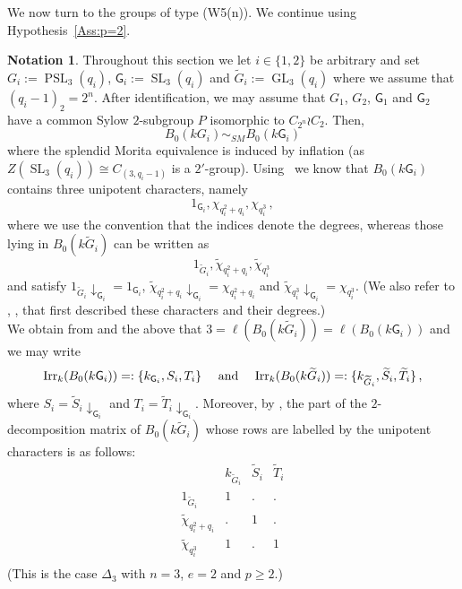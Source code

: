 \documentclass[12pt,a4paper]{amsart}
\theoremstyle{plain}\newtheorem{Theorem}{Theorem}[section]
\theoremstyle{plain}\newtheorem{Conjecture}[Theorem]{Conjecture}
\theoremstyle{plain}\newtheorem{Corollary}[Theorem]{Corollary}
\theoremstyle{plain}\newtheorem{Lemma}[Theorem]{Lemma}
\theoremstyle{plain}\newtheorem{Proposition}[Theorem]{Proposition}
\theoremstyle{definition}\newtheorem{Definition}[Theorem]{Definition}
\theoremstyle{definition}\newtheorem{Example}[Theorem]{Example}
\theoremstyle{definition}\newtheorem{Examples}[Theorem]{Examples}
\theoremstyle{definition}\newtheorem{Remark}[Theorem]{Remark}
\theoremstyle{definition}\newtheorem{Question}[Theorem]{Question}
\theoremstyle{definition}\newtheorem{Notation}[Theorem]{Notation}
\theoremstyle{definition}\newtheorem{Hypothesis}[Theorem]{Hypothesis}
\theoremstyle{definition}\newtheorem{Assumption}[Theorem]{Assumption}
\theoremstyle{definition}\newtheorem{Strategy}[Theorem]{Strategy}
\theoremstyle{definition}\newtheorem{Contents}[Theorem]{Contents}
\theoremstyle{definition}\newtheorem{Computations}[Theorem]{Computations}
\theoremstyle{definition}\newtheorem{Equivalences}[Theorem]{Equivalences}
\theoremstyle{definition}\newtheorem{Notation/Definition}[Theorem]{Notation/Definition}
\theoremstyle{definition}\newtheorem{noth}[Theorem]{}
\theoremstyle{plain}\newtheorem{Step}[Theorem]{Step}
\def\Res{\mathrm{Res}}
\DeclareMathOperator{\Inf}{Inf}
\newcommand{\PSL}{\operatorname{PSL}}
\newcommand{\SL}{\operatorname{SL}}
\newcommand{\GL}{\operatorname{GL}}
\begin{document}
We now turn to the groups of type {\sf (W5(n))}.  
We continue using Hypothesis~\ref{Ass:p=2}. 


\begin{Notation}\label{nota:PSL_{3}}%
Throughout this section we let  $i\in\{1,2\}$ be arbitrary and set  $G_{i}:=\PSL_{3}(q_{i})$, $\mathsf G_{i}:=\SL_{3}(q_{i})$ and $\widetilde{G}_{i}:=\GL_{3}(q_{i})$ where we assume that $(q_{i}-1)_{2}=2^{n}$. After identification, we may assume that  $G_{1}$, $G_{2}$, $\mathsf G_{1}$ and $\mathsf G_{2}$ have a common Sylow $2$-subgroup $P$ isomorphic to $C_{2^n}\wr C_2$. 
Then,
\begin{equation}\label{sm:PSLSLGL}
B_{0}(kG_{i})   \sim_{SM}   B_{0}(k\mathsf{G}_{i}) 
\end{equation}
where the splendid Morita equivalence is induced by inflation (as $Z(\SL_{3}(q_{i}))\cong C_{(3,q_{i}-1)}$ is a $2'$-group).
Using~\cite[Proposition~4.3.1 and Remark~4.2.1]{GM20} we know that $B_{0}(k\mathsf{G}_{i})$ contains three unipotent characters, namely
$$1_{\mathsf{G}_{i}}, \chi^{}_{q_{i}^2+q_{i}}, \chi^{}_{q_{i}^3}\,,$$ 
where we use the convention that the indices denote the degrees, whereas those lying in $B_{0}(k\widetilde{G}_{i})$ can be written as 
$$1_{\widetilde{G}_{i}}, \widetilde \chi^{}_{q_{i}^2+q_{i}}, \widetilde \chi^{}_{q_{i}^3}\,$$ 
and satisfy $1_{\widetilde{G}_{i}}{\downarrow}_{\mathsf{G}_{i}}=1_{\mathsf{G}_{i}}$,  $\widetilde \chi^{}_{q_{i}^2+q_{i}}{\downarrow}_{\mathsf{G}_{i}}=\chi^{}_{q_{i}^2+q_{i}}$ and $\widetilde \chi^{}_{q_{i}^3}{\downarrow}_{\mathsf{G}_{i}}=\chi^{}_{q_{i}^3}$.  (We also refer to \cite{Ste51}, \cite[7.19. Theorem(i)]{Jam86}, that first described these characters and their degrees.)\\
We obtain from \cite[\S4]{Jam90} and the above that $3=\ell(B_{0}(k\widetilde{G}_{i}))=\ell(B_{0}(k\mathsf{G}_{i}))$ and we may write
$$\mathrm{Irr}_{k}(B_{0}(k\mathsf{G}_{i}))=:\{k_{\mathsf{G}_{i}}, S_{i}, T_{i}\}\quad\text{ and }\quad \mathrm{Irr}_{k}(B_{0}(k\widetilde{G}_{i}))=:\{k_{\widetilde{G}_{i}}, \widetilde{S}_{i}, \widetilde{T}_{i}\}\,,$$
where  $S_i=\widetilde S_i{\downarrow}_{\mathsf{G}_{i}}$ and $T_i=\widetilde T_i{\downarrow}_{\mathsf{G}_i}$.
Moreover, by \cite[p.\,253]{Jam90},  the part of the $2$-decomposition matrix of $B_{0}(k\widetilde{G}_{i})$ whose rows are labelled by 
the unipotent characters is as follows:
\[
\begin{array}{l|ccc} & k_{\widetilde{G}_{i}} & \widetilde S_{i} &  \widetilde T_{i}\\ \hline
1_{\widetilde{G}_{i}} & 1& .&. \\ 
\widetilde\chi^{}_{q_{i}^2+q_{i}}& . &1 & .\\
\widetilde\chi^{}_{q_{i}^3} & 1& . & 1 \\
\end{array}
\]
(This is the case $\Delta_3$ with $n=3$, $e=2$ and $p\geq 2$.)
\end{Notation}
\end{document}
